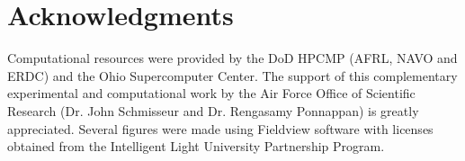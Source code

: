 \documentclass[english]{aiaa-tc}
\begin{document}
\section*{Acknowledgments}
   Computational resources were provided by the DoD HPCMP (AFRL, NAVO
   and ERDC) and the Ohio Supercomputer Center. The support of this
   complementary experimental and computational work by the Air Force
   Office of Scientific Research (Dr. John Schmisseur and
   Dr. Rengasamy Ponnappan) is greatly appreciated. Several figures
   were made using Fieldview software with licenses obtained from the
   Intelligent Light University Partnership Program.



\end{document}

